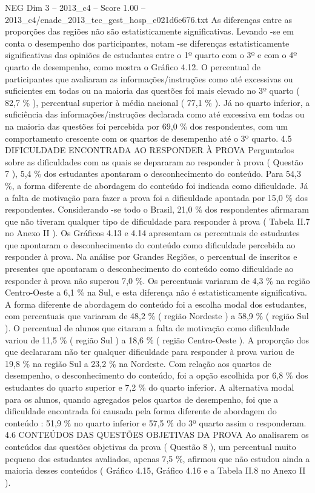 \begin{textsample}{NEG Dim 3 – 2013\_c4 – Score 1.00 – 2013\_c4/enade\_2013\_tec\_gest\_hosp\_e021d6e676.txt}
As diferenças entre as proporções das regiões não são estatisticamente significativas.
Levando -se em conta o desempenho dos participantes, notam -se diferenças estatisticamente significativas das opiniões de estudantes entre o 1º quarto com o 3º e com o 4º quarto de desempenho, como mostra o Gráfico 4.12.
O percentual de participantes que avaliaram as informações/instruções como até excessivas ou suficientes em todas ou na maioria das questões foi mais elevado no 3º quarto ( 82,7 \% ), percentual superior à média nacional ( 77,1 \% ).
Já no quarto inferior, a suficiência das informações/instruções declarada como até excessiva em todas ou na maioria das questões foi percebida por 69,0 \% dos respondentes, com um comportamento crescente com os quartos de desempenho até o 3º quarto. 4.5 DIFICULDADE ENCONTRADA AO RESPONDER À PROVA Perguntados sobre as dificuldades com as quais se depararam ao responder à prova ( Questão 7 ), 5,4 \% dos estudantes apontaram o desconhecimento do conteúdo.
Para 54,3 \%, a forma diferente de abordagem do conteúdo foi indicada como dificuldade.
Já a falta de motivação para fazer a prova foi a dificuldade apontada por 15,0 \% dos respondentes.
Considerando -se todo o Brasil, 21,0 \% dos respondentes afirmaram que não tiveram qualquer tipo de dificuldade para responder à prova ( Tabela II.7 no Anexo II ).
Os Gráficos 4.13 e 4.14 apresentam os percentuais de estudantes que apontaram o desconhecimento do conteúdo como dificuldade percebida ao responder à prova.
Na análise por Grandes Regiões, o percentual de inscritos e presentes que apontaram o desconhecimento do conteúdo como dificuldade ao responder à prova não superou 7,0 \%.
Os percentuais variaram de 4,3 \% na região Centro-Oeste a 6,1 \% na Sul, e esta diferença não é estatisticamente significativa.
A forma diferente de abordagem do conteúdo foi a escolha modal dos estudantes, com percentuais que variaram de 48,2 \% ( região Nordeste ) a 58,9 \% ( região Sul ).
O percentual de alunos que citaram a falta de motivação como dificuldade variou de 11,5 \% ( região Sul ) a 18,6 \% ( região Centro-Oeste ).
A proporção dos que declararam não ter qualquer dificuldade para responder à prova variou de 19,8 \% na região Sul a 23,2 \% na Nordeste.
Com relação aos quartos de desempenho, o desconhecimento do conteúdo, foi a opção escolhida por 6,8 \% dos estudantes do quarto superior e 7,2 \% do quarto inferior.
A alternativa modal para os alunos, quando agregados pelos quartos de desempenho, foi que a dificuldade encontrada foi causada pela forma diferente de abordagem do conteúdo : 51,9 \% no quarto inferior e 57,5 \% do 3º quarto assim o responderam. 4.6 CONTEÚDOS DAS QUESTÕES OBJETIVAS DA PROVA Ao analisarem os conteúdos das questões objetivas da prova ( Questão 8 ), um percentual muito pequeno dos estudantes avaliados, apenas 7,5 \%, afirmou que não estudou ainda a maioria desses conteúdos ( Gráfico 4.15, Gráfico 4.16 e a Tabela II.8 no Anexo II ).

\end{textsample}

